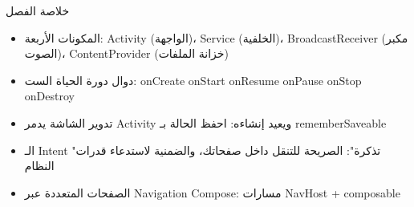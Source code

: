 \begin{tcbsummary}{خلاصة الفصل}
\begin{itemize}
  \item المكونات الأربعة: Activity (الواجهة)، Service (الخلفية)، BroadcastReceiver (مكبر الصوت)، ContentProvider (خزانة الملفات)
  \item دوال دورة الحياة الست: onCreate onStart onResume onPause onStop onDestroy
  \item تدوير الشاشة يدمر Activity ويعيد إنشاءه: احفظ الحالة بـ rememberSaveable
  \item الـ Intent "تذكرة": الصريحة للتنقل داخل صفحاتك، والضمنية لاستدعاء قدرات النظام
  \item الصفحات المتعددة عبر Navigation Compose: مسارات NavHost + composable
\end{itemize}

\end{tcbsummary}

